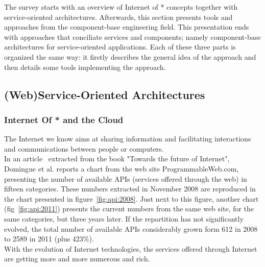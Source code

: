 The survey starts with an overview of Internet of * concepts together with service-oriented architectures. Afterwards, this section presents tools and approaches from the component-base engineering field. This presentation ends with approaches that conciliate services and components; namely component-base architectures for service-oriented applications. Each of these three parts is organized the same way: it firstly describes the general idea of the approach and then details some tools implementing the approach.


\subsection{(Web)Service-Oriented Architectures}
\label{sec:web-services}


\subsubsection{Internet Of * and the Cloud}
\label{subsec:internet_of_stars}

The Internet we know aims at sharing information and facilitating interactions and communications between people or computers.\\

In an article~\cite{Domingue:2009} extracted from the book "Towards the future of Internet", Domingue et al. reports a chart from the web site ProgrammableWeb.com, presenting the number of available APIs (services offered through the web) in fifteen categories. These numbers extracted in November 2008 are reproduced in the chart presented in figure~\ref{fig:api:2008}. Just next to this figure, another chart (fig~\ref{fig:api:2011}) presents the current numbers from the same web site, for the same categories, but three years later. If the repartition has not significantly evolved, the total number of available APIs considerably grown form 612 in 2008 to 2589 in 2011 (plus 423\%).\\
With the evolution of Internet technologies, the services offered through Internet are getting more and more numerous and rich.\\

